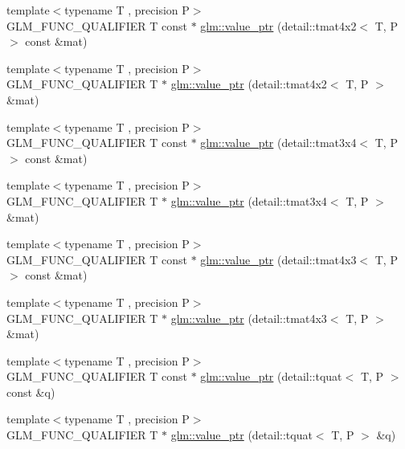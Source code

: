 \begin{DoxyCompactItemize}
\item 
{\footnotesize template$<$typename T , precision P$>$ }\\G\-L\-M\-\_\-\-F\-U\-N\-C\-\_\-\-Q\-U\-A\-L\-I\-F\-I\-E\-R T const $\ast$ \hyperlink{group__gtc__type__ptr_ga73acc0dbfeeb9e6c09df1f79fd990b84}{glm\-::value\-\_\-ptr} (detail\-::tmat4x2$<$ T, P $>$ const \&mat)
\item 
{\footnotesize template$<$typename T , precision P$>$ }\\G\-L\-M\-\_\-\-F\-U\-N\-C\-\_\-\-Q\-U\-A\-L\-I\-F\-I\-E\-R T $\ast$ \hyperlink{group__gtc__type__ptr_ga478c7dc470b36836ac5392e852fd2348}{glm\-::value\-\_\-ptr} (detail\-::tmat4x2$<$ T, P $>$ \&mat)
\item 
{\footnotesize template$<$typename T , precision P$>$ }\\G\-L\-M\-\_\-\-F\-U\-N\-C\-\_\-\-Q\-U\-A\-L\-I\-F\-I\-E\-R T const $\ast$ \hyperlink{group__gtc__type__ptr_ga233effe326542ae9657b8feac80e541f}{glm\-::value\-\_\-ptr} (detail\-::tmat3x4$<$ T, P $>$ const \&mat)
\item 
{\footnotesize template$<$typename T , precision P$>$ }\\G\-L\-M\-\_\-\-F\-U\-N\-C\-\_\-\-Q\-U\-A\-L\-I\-F\-I\-E\-R T $\ast$ \hyperlink{group__gtc__type__ptr_gad8c6b1dbda2b48d19fd1bc8b01cf701c}{glm\-::value\-\_\-ptr} (detail\-::tmat3x4$<$ T, P $>$ \&mat)
\item 
{\footnotesize template$<$typename T , precision P$>$ }\\G\-L\-M\-\_\-\-F\-U\-N\-C\-\_\-\-Q\-U\-A\-L\-I\-F\-I\-E\-R T const $\ast$ \hyperlink{group__gtc__type__ptr_gaebe5b66d8b05f6ace85d26cedd03732d}{glm\-::value\-\_\-ptr} (detail\-::tmat4x3$<$ T, P $>$ const \&mat)
\item 
{\footnotesize template$<$typename T , precision P$>$ }\\G\-L\-M\-\_\-\-F\-U\-N\-C\-\_\-\-Q\-U\-A\-L\-I\-F\-I\-E\-R T $\ast$ \hyperlink{group__gtc__type__ptr_ga4a4b23867cc26441441ff4458844fa27}{glm\-::value\-\_\-ptr} (detail\-::tmat4x3$<$ T, P $>$ \&mat)
\item 
{\footnotesize template$<$typename T , precision P$>$ }\\G\-L\-M\-\_\-\-F\-U\-N\-C\-\_\-\-Q\-U\-A\-L\-I\-F\-I\-E\-R T const $\ast$ \hyperlink{group__gtc__type__ptr_ga961a5b150a0ffd632aaa0252c4d6b9ab}{glm\-::value\-\_\-ptr} (detail\-::tquat$<$ T, P $>$ const \&q)
\item 
{\footnotesize template$<$typename T , precision P$>$ }\\G\-L\-M\-\_\-\-F\-U\-N\-C\-\_\-\-Q\-U\-A\-L\-I\-F\-I\-E\-R T $\ast$ \hyperlink{group__gtc__type__ptr_gab72389186ae9e8c822ff6cc9b474a37f}{glm\-::value\-\_\-ptr} (detail\-::tquat$<$ T, P $>$ \&q)
\end{DoxyCompactItemize}


